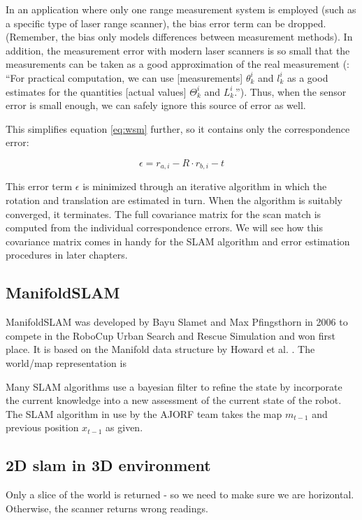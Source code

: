 In an application where only one range measurement system is employed (such as a specific type of laser range scanner), the bias error term can be dropped. (Remember, the bias only models differences between measurement methods). In addition, the measurement error with modern laser scanners is so small that the measurements can be taken as a good approximation of the real measurement (\cite{pfister2002weighted}: ``For practical computation, we can use [measurements] $\theta^i_k$ and $l^i_k$ as a good estimates for the quantities [actual values] $\Theta^i_k$ and $L^i_k$.''). Thus, when the sensor error is small enough, we can safely ignore this source of error as well. 

This simplifies equation \ref{eq:wsm} further, so it contains only the correspondence error:

\begin{equation}
\epsilon = r_{a, i} - R \cdot r_{b, i} - t
\end{equation}

This error term $\epsilon$ is minimized through an iterative algorithm in which the rotation and translation are estimated in turn. When the algorithm is suitably converged, it terminates. The full covariance matrix for the scan match is computed from the individual correspondence errors. We will see how this covariance matrix comes in handy for the SLAM algorithm and error estimation procedures in later chapters.

\subsection{ManifoldSLAM}
ManifoldSLAM was developed by Bayu Slamet and Max Pfingsthorn in 2006 \cite{slametpfingsthornthesis} to compete in the RoboCup Urban Search and Rescue Simulation and won first place. It is based on the Manifold data structure by Howard et al. \cite{howard2006multirobot}. The world/map representation is 

Many SLAM algorithms use a bayesian filter to refine the state by incorporate the current knowledge into a new assessment of the current state of the robot. The SLAM algorithm in use by the AJORF team takes the map $m_{t-1}$ and previous position $x_{t-1}$ as given. 


\subsection{2D slam in 3D environment}
Only a slice of the world is returned - so we need to make sure we are horizontal. Otherwise, the scanner returns wrong readings.


